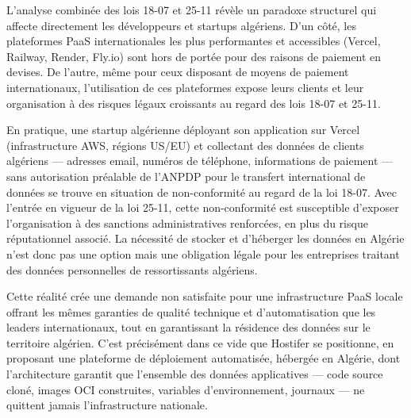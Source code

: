 L'analyse combinée des lois 18-07 et 25-11 révèle un paradoxe structurel qui affecte directement les développeurs et startups algériens. D'un côté, les plateformes PaaS internationales les plus performantes et accessibles (Vercel, Railway, Render, Fly.io) sont hors de portée pour des raisons de paiement en devises. De l'autre, même pour ceux disposant de moyens de paiement internationaux, l'utilisation de ces plateformes expose leurs clients et leur organisation à des risques légaux croissants au regard des lois 18-07 et 25-11.

En pratique, une startup algérienne déployant son application sur Vercel (infrastructure AWS, régions US/EU) et collectant des données de clients algériens — adresses email, numéros de téléphone, informations de paiement — sans autorisation préalable de l'ANPDP pour le transfert international de données se trouve en situation de non-conformité au regard de la loi 18-07. Avec l'entrée en vigueur de la loi 25-11, cette non-conformité est susceptible d'exposer l'organisation à des sanctions administratives renforcées, en plus du risque réputationnel associé. La nécessité de stocker et d'héberger les données en Algérie n'est donc pas une option mais une obligation légale pour les entreprises traitant des données personnelles de ressortissants algériens. 

Cette réalité crée une demande non satisfaite pour une infrastructure PaaS locale offrant les mêmes garanties de qualité technique et d'automatisation que les leaders internationaux, tout en garantissant la résidence des données sur le territoire algérien. C'est précisément dans ce vide que Hostifer se positionne, en proposant une plateforme de déploiement automatisée, hébergée en Algérie, dont l'architecture garantit que l'ensemble des données applicatives — code source cloné, images OCI construites, variables d'environnement, journaux — ne quittent jamais l'infrastructure nationale.

